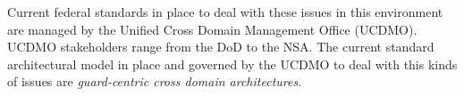 Current federal standards in place to deal with these issues in this environment are managed by the Unified Cross Domain Management Office (UCDMO).  UCDMO stakeholders range from the DoD to the NSA.  The current standard architectural model in place and governed by the UCDMO to deal with this kinds of issues are \textit{guard-centric cross domain architectures}.
